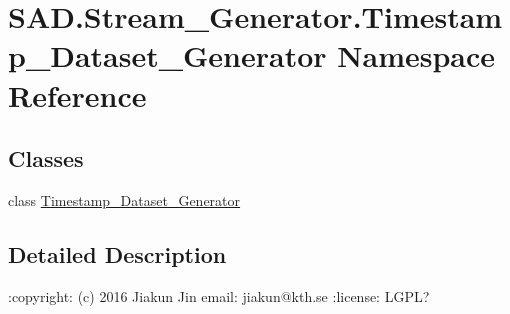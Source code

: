 \hypertarget{namespaceSAD_1_1Stream__Generator_1_1Timestamp__Dataset__Generator}{}\section{S\+A\+D.\+Stream\+\_\+\+Generator.\+Timestamp\+\_\+\+Dataset\+\_\+\+Generator Namespace Reference}
\label{namespaceSAD_1_1Stream__Generator_1_1Timestamp__Dataset__Generator}
\subsection*{Classes}
\begin{DoxyCompactItemize}
\item 
class \hyperlink{classSAD_1_1Stream__Generator_1_1Timestamp__Dataset__Generator_1_1Timestamp__Dataset__Generator}{Timestamp\+\_\+\+Dataset\+\_\+\+Generator}
\end{DoxyCompactItemize}


\subsection{Detailed Description}
\begin{DoxyVerb}:copyright: (c) 2016 Jiakun Jin
email: jiakun@kth.se
:license: LGPL?
\end{DoxyVerb}
 
